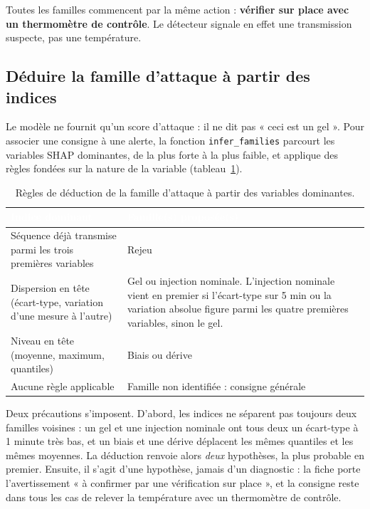 Toutes les familles commencent par la même action : \textbf{vérifier sur
place avec un thermomètre de contrôle}. Le détecteur signale en effet une
transmission suspecte, pas une température.

\subsection{Déduire la famille d'attaque à partir des indices}
\label{sec:expl_deduction}

Le modèle ne fournit qu'un score d'attaque : il ne dit pas « ceci est un
gel ». Pour associer une consigne à une alerte, la fonction
\texttt{infer\_families} parcourt les variables SHAP dominantes, de la plus
forte à la plus faible, et applique des règles fondées sur la nature de la
variable (tableau~\ref{tab:expl_deduction}).

\begin{table}[H]
\centering
\small
\renewcommand{\arraystretch}{1.35}
\caption{Règles de déduction de la famille d'attaque à partir des variables
dominantes.}
\label{tab:expl_deduction}
\begin{tabularx}{\textwidth}{@{}|>{\raggedright\arraybackslash}X|>{\raggedright\arraybackslash}X|@{}}
\hline
\rowcolor{thead}
\textcolor{white}{\textbf{Indice dominant}} &
\textcolor{white}{\textbf{Famille(s) proposée(s)}} \\
\hline
Séquence déjà transmise parmi les trois premières variables & Rejeu \\
\hline
\rowcolor{trowa}
Dispersion en tête (écart-type, variation d'une mesure à l'autre) & Gel ou
injection nominale. L'injection nominale vient en premier si l'écart-type sur
5 min ou la variation absolue figure parmi les quatre premières variables,
sinon le gel. \\
\hline
Niveau en tête (moyenne, maximum, quantiles) & Biais ou dérive \\
\hline
\rowcolor{trowa}
Aucune règle applicable & Famille non identifiée : consigne générale \\
\hline
\end{tabularx}
\end{table}

Deux précautions s'imposent. D'abord, les indices ne séparent pas toujours
deux familles voisines : un gel et une injection nominale ont tous deux un
écart-type à 1 minute très bas, et un biais et une dérive déplacent les mêmes
quantiles et les mêmes moyennes. La déduction renvoie alors \emph{deux}
hypothèses, la plus probable en premier. Ensuite, il s'agit d'une hypothèse,
jamais d'un diagnostic : la fiche porte l'avertissement « à confirmer par
une vérification sur place », et la consigne reste dans tous les cas de
relever la température avec un thermomètre de contrôle.

